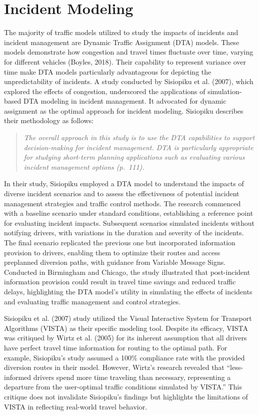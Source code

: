 \documentclass[fancy, oneside, mastersfancy, ms]{byuthesis}
\begin{document}
\hypertarget{sec-inc_modeling}{%
\section{Incident Modeling}\label{sec-inc_modeling}}

The majority of traffic models utilized to study the impacts of
incidents and incident management are Dynamic Traffic Assignment (DTA)
models. These models demonstrate how congestion and travel times
fluctuate over time, varying for different vehicles (Boyles, 2018).
Their capability to represent variance over time make DTA models
particularly advantageous for depicting the unpredictability of
incidents. A study conducted by Sisiopiku et al. (2007), which explored
the effects of congestion, underscored the applications of
simulation-based DTA modeling in incident management. It advocated for
dynamic assignment as the optimal approach for incident modeling.
Sisiopiku describes their methodology as follows:

\begin{quote}
\emph{The overall approach in this study is to use the DTA capabilities
to support decision-making for incident management. DTA is particularly
appropriate for studying short-term planning applications such as
evaluating various incident management options (p.~111).}
\end{quote}

In their study, Sisiopiku employed a DTA model to understand the impacts
of diverse incident scenarios and to assess the effectiveness of
potential incident management strategies and traffic control methods.
The research commenced with a baseline scenario under standard
conditions, establishing a reference point for evaluating incident
impacts. Subsequent scenarios simulated incidents without notifying
drivers, with variations in the duration and severity of the incidents.
The final scenario replicated the previous one but incorporated
information provision to drivers, enabling them to optimize their routes
and access preplanned diversion paths, with guidance from Variable
Message Signs. Conducted in Birmingham and Chicago, the study
illustrated that post-incident information provision could result in
travel time savings and reduced traffic delays, highlighting the DTA
model's utility in simulating the effects of incidents and evaluating
traffic management and control strategies.

Sisiopiku et al. (2007) study utilized the Visual Interactive System for
Transport Algorithms (VISTA) as their specific modeling tool. Despite
its efficacy, VISTA was critiqued by Wirtz et al. (2005) for its
inherent assumption that all drivers have perfect travel time
information for routing to the optimal path. For example, Sisiopiku's
study assumed a 100\% compliance rate with the provided diversion routes
in their model. However, Wirtz's research revealed that ``less-informed
drivers spend more time traveling than necessary, representing a
departure from the user-optimal traffic conditions simulated by VISTA.''
This critique does not invalidate Sisiopiku's findings but highlights
the limitations of VISTA in reflecting real-world travel behavior.
\end{document}
